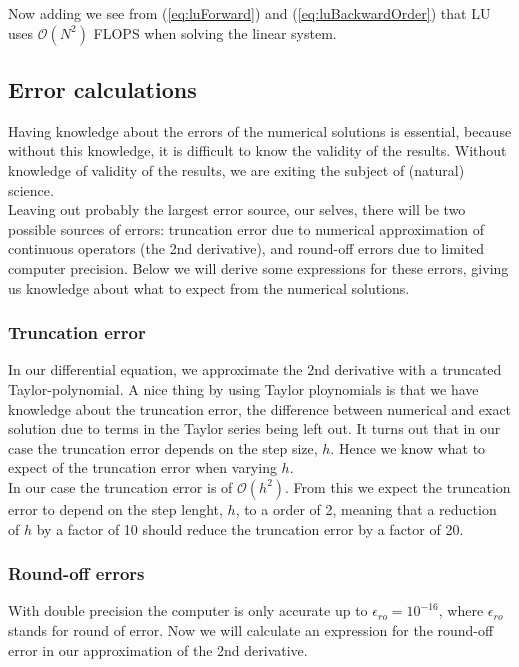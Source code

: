 \documentclass{article}
\begin{document}
Now adding we see from (\ref{eq:luForward}) and (\ref{eq:luBackwardOrder}) that LU uses $\mathcal{O}(N^2)$ FLOPS when solving the linear system.

\subsection{Error calculations}
Having knowledge about the errors of the numerical solutions is essential, because without this knowledge, it is difficult to know the validity of the results. Without knowledge of validity of the results, we are exiting the subject of (natural) science. \\

Leaving out probably the largest error source, our selves, there will be two possible sources of errors: truncation error due to numerical approximation of continuous operators (the 2nd derivative), and round-off errors due to limited computer precision. Below we will derive some expressions for these errors, giving us knowledge about what to expect from the numerical solutions.

\subsubsection{Truncation error}

In our differential equation, we approximate the 2nd derivative with a truncated Taylor-polynomial. A nice thing by using Taylor ploynomials is that we have knowledge about the truncation error, the difference between numerical and exact solution due to terms in the Taylor series being left out. It turns out that in our case the truncation error depends on the step size, $h$. Hence we know what to expect of the truncation error when varying $h$. \\

In our case the truncation error is of $\mathcal{O}(h^2)$. From this we expect the truncation error to depend on the step lenght, $h$, to a order of 2, meaning that a reduction of $h$ by a factor of 10 should reduce the truncation error by a factor of 20.

\subsubsection{Round-off errors}
With double precision the computer is only accurate up to $\epsilon_{ro} = 10^{-16}$, where $\epsilon_{ro}$ stands for round of error. Now we will calculate an expression for the round-off error in our approximation of the 2nd derivative.\\
\end{document}
